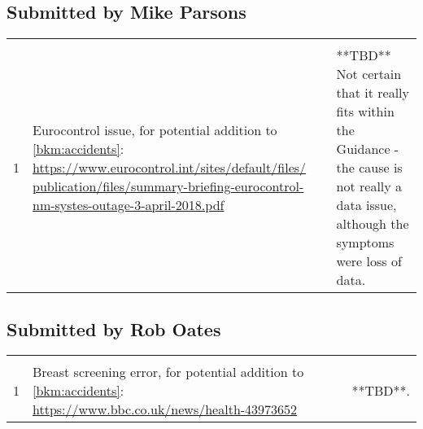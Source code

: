 \subsection{Submitted by Mike Parsons}
\begin{longtable}[H]
{|L{}|L{}|L{}|}
\hline
{} &  & \\
\hline
  \endfirsthead
  \hline{} &  & \\\hline
  \endhead
  \endfoot
  \endlastfoot

1&Eurocontrol issue, for potential addition to \autoref{bkm:accidents}: \href{https://www.eurocontrol.int/sites/default/files/publication/files/summary-briefing-eurocontrol-nm-systes-outage-3-april-2018.pdf}{https://www.eurocontrol.int/sites/default/files/ publication/files/summary-briefing-eurocontrol- nm-systes-outage-3-april-2018.pdf}&**TBD** Not certain that it really fits within the Guidance - the cause is not really a data issue, although the symptoms were loss of data.\\\hline
\end{longtable}

\subsection{Submitted by Rob Oates}
\begin{longtable}[H]
{|L{}|L{}|L{}|}
\hline
{} &  & \\
\hline
  \endfirsthead
  \hline{} &  & \\\hline
  \endhead
  \endfoot
  \endlastfoot

1&Breast screening error, for potential addition to \autoref{bkm:accidents}: \href{https://www.bbc.co.uk/news/health-43973652}{https://www.bbc.co.uk/news/health-43973652}&**TBD**.\\\hline
\end{longtable}

\clearpage
